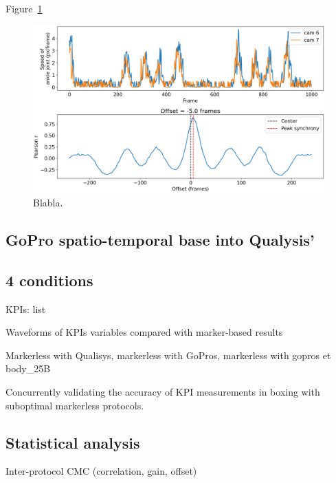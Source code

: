Figure~\ref{fig_sync}

\begin{figure}[!ht]
	\centering
	\def\svgwidth{1\columnwidth}
	\fontsize{10pt}{10pt}\selectfont
	\includegraphics[width=\linewidth]{"../Chap6/Figures/Fig_Sync.png"}
	\caption{Blabla.}
	\label{fig_sync}
\end{figure}


\subsection{GoPro spatio-temporal base into Qualysis'}

\blindtext


\subsection{4 conditions}

KPIs: list

Waveforms of KPIs variables compared with marker-based results

Markerless with Qualisys, markerless with GoPros, markerless with gopros et body\_25B








Concurrently validating the accuracy of KPI measurements in boxing with suboptimal markerless protocols.





\subsection{Statistical analysis}

Inter-protocol CMC \cite{Ferrari2010} (correlation, gain, offset)


